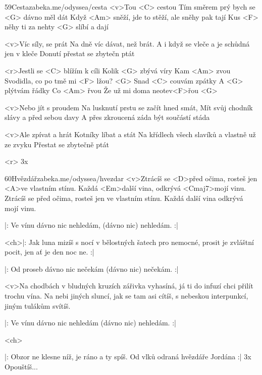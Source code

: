 \begin{song}[Kryštof]{59}{Cesta}{zabeka.me/odyssea/cesta}
	<v>Tou <C> cestou
	Tím směrem prý bych se <G> dávno měl dát
	Když <Am> sněží, jde to stěží, ale sněhy pak tají
	Kus <F> něhy ti za nehty <G> slíbí a dají

	<v>Víc síly, se prát
	Na dně víc dávat, než brát.
	A i když se vleče a je schůdná jen v kleče
	Donutí přestat se zbytečn ptát

	<r>Jestli se <C> blížím k cíli
	Kolik <G> zbývá víry
	Kam <Am> zvou
	Svodidla, co po tmě mi <F> lžou? <G>
	Snad <C> couvám zpátky
	A <G> plýtvám řádky
	Co <Am> řvou
	Že už mi doma neotev<F>řou <G>

	<v>Nebo jít s proudem
	Na lusknutí prstu se začít hned smát,
	Mít svůj chodník slávy a před sebou davy
	A přes zkroucená záda být součástí stáda

	<v>Ale zpívat a hrát
	Kotníky líbat a stát
	Na křídlech všech slavíků a vlastně už ze zvyku
	Přestat se zbytečně ptát

	<r>
	3x
\end{song}
\begin{song}[UDG]{60}{Hvězdář}{zabeka.me/odyssea/hvezdar}
	<v>Ztrácíš se <D>před očima, rosteš jen <A>ve vlastním stínu.
	Každá <Em>další vina, odkrývá <Cmaj7>mojí vinu.
	Ztrácíš se před očima, rosteš jen ve vlastním stínu.
	Každá další vina odkrývá mojí vinu.

	|: Ve vínu dávno nic nehledám, (dávno nic) nehledám. :|

	<ch>|: Jak luna mizíš s nocí v bělostných šatech pro nemocné,
	prosit je zvláštní pocit, jen ať je den noc ne. :|

	|: Od proseb dávno nic nečekám (dávno nic) nečekám. :|

	<v>Na chodbách v bludných kruzích zářivka vyhasíná,
	já ti do infuzí chci přilít trochu vína.
	Na nebi jiných sluncí, jak se tam asi cítíš,
	s nebeskou interpunkcí, jiným tulákům svítíš.

	|: Ve vínu dávno nic nehledám (dávno nic) nehledám. :|

	<ch>

	|: Obzor ne klesne níž, je ráno a ty spíš.
	Od vlků odraná hvězdáře Jordána :| 3x
	Opouštíš...
\end{song}
